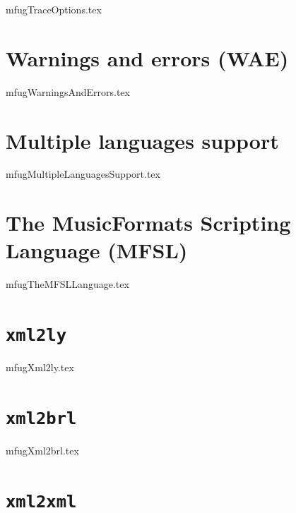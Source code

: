 \documentclass[11pt,a4paper]{report}
\begin{document}
{mfugTraceOptions.tex}



\part{Warnings and errors (WAE)}

{mfugWarningsAndErrors.tex}


\part{Multiple languages support}

{mfugMultipleLanguagesSupport.tex}


\part{The MusicFormats Scripting Language (MFSL)}

{mfugTheMFSLLanguage.tex}


\part{{\tt xml2ly}}

{mfugXml2ly.tex}


\part{{\tt xml2brl}}

{mfugXml2brl.tex}


\part{{\tt xml2xml}}
\end{document}
